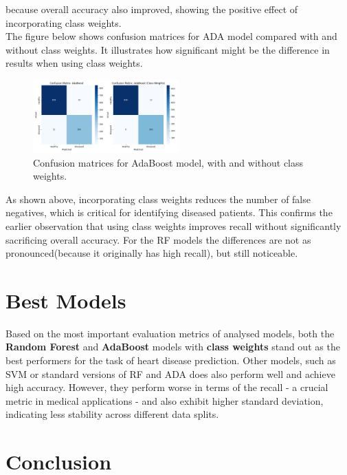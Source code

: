 \documentclass[conference]{IEEEtran}
\begin{document}
because overall accuracy also improved, showing the positive effect of incorporating class weights.
\\
\newpage
The figure below shows confusion matrices for ADA model compared with and without class weights. It illustrates
how significant might be the difference in results when using class weights.
\begin{figure}[H]
    \centering
    \includegraphics[width=0.5\textwidth]{../src/plots/conf_matrices_adaboost_comparison.png}
    \caption{Confusion matrices for AdaBoost model, with and without class weights.}
    \label{fig:confusion_matrices}
\end{figure}
As shown above, incorporating class weights reduces the number of false negatives, which is critical
for identifying diseased patients. This confirms the earlier observation that using class weights improves recall
without significantly sacrificing overall accuracy. For the RF models the differences are not as pronounced(because
it originally has high recall), but still noticeable.

\section{Best Models}
Based on the most important evaluation metrics of analysed models, both the \textbf{Random Forest}
and \textbf{AdaBoost} models with \textbf{class weights} 
stand out as the best performers for the task of heart disease prediction. 
Other models, such as SVM or standard versions of
RF and ADA does also perform well and achieve high accuracy. However, they perform worse in terms of the recall 
- a crucial metric in medical applications -
and also exhibit higher standard deviation, indicating less stability across different data splits.

\section{Conclusion}
\end{document}

